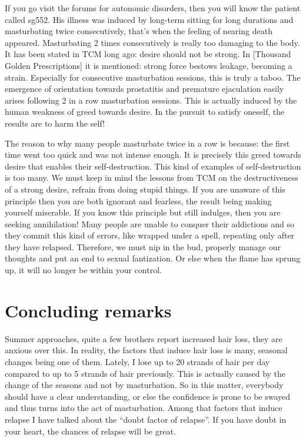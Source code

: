 \documentclass[
]{book}
\begin{document}
If you go visit the forums for autonomic disorders, then you will know the patient called sg552. His illness was induced by long-term sitting for long durations and masturbating twice consecutively, that's when the feeling of nearing death appeared. Masturbating 2 times consecutively is really too damaging to the body. It has been stated in TCM long ago: desire should not be strong. In {[}Thousand Golden Prescriptions{]} it is mentioned: strong force bestows leakage, becoming a strain. Especially for consecutive masturbation sessions, this is truly a taboo. The emergence of orientation towards prostatitis and premature ejaculation easily arises following 2 in a row masturbation sessions. This is actually induced by the human weakness of greed towards desire. In the pursuit to satisfy oneself, the results are to harm the self!

The reason to why many people masturbate twice in a row is because: the first time went too quick and was not intense enough. It is precisely this greed towards desire that enables their self-destruction. This kind of examples of self-destruction is too many. We must keep in mind the lessons from TCM on the destructiveness of a strong desire, refrain from doing stupid things. If you are unaware of this principle then you are both ignorant and fearless, the result being making yourself miserable. If you know this principle but still indulges, then you are seeking annihilation! Many people are unable to conquer their addictions and so they commit this kind of errors, like wrapped under a spell, repeating only after they have relapsed. Therefore, we must nip in the bud, properly manage our thoughts and put an end to sexual fantization. Or else when the flame has sprung up, it will no longer be within your control.

\hypertarget{concluding-remarks-2}{%
\section{Concluding remarks}\label{concluding-remarks-2}}

Summer approaches, quite a few brothers report increased hair loss, they are anxious over this. In reality, the factors that induce hair loss is many, seasonal changes being one of them. Lately, I lose up to 20 strands of hair per day compared to up to 5 strands of hair previously. This is actually caused by the change of the seasons and not by masturbation. So in this matter, everybody should have a clear understanding, or else the confidence is prone to be swayed and thus turns into the act of masturbation. Among that factors that induce relapse I have talked about the ``doubt factor of relapse''. If you have doubt in your heart, the chances of relapse will be great.
\end{document}
